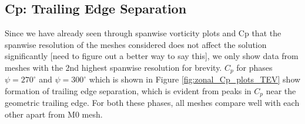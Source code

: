 \subsection{Cp: Trailing Edge Separation}


Since we have already seen through spanwise vorticity plots and Cp that the spanwise resolution of the meshes considered does not affect the solution significantly [need to figure out a better way to say this], we only show data from meshes with the 2nd highest spanwise resolution for brevity. $C_p$ for phases $\psi=270^\circ$ and $\psi=300^\circ$ which is shown in Figure \ref{fig:zonal_Cp_plots_TEV} show formation of trailing edge separation, which is evident from peaks in $C_p$ near the geometric trailing edge. For both these phases, all meshes compare well with each other apart from M0 mesh.


